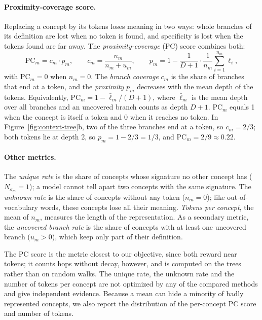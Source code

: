 \paragraph{Proximity-coverage score.}
Replacing a concept by its tokens loses meaning in two ways: whole branches of its definition are lost when no token is found, and specificity is lost when the tokens found are far away.
The \emph{proximity-coverage} (PC) score combines both:
\[
\mathrm{PC}_m = c_m \cdot p_m,
\qquad
c_m = \frac{n_m}{n_m + u_m},
\qquad
p_m = 1 - \frac{1}{D + 1} \cdot \frac{1}{n_m} \sum_{i=1}^{n_m} \ell_i ,
\]
with $\mathrm{PC}_m = 0$ when $n_m = 0$.
The \emph{branch coverage} $c_m$ is the share of branches that end at a token, and the \emph{proximity} $p_m$ decreases with the mean depth of the tokens.
Equivalently, $\mathrm{PC}_m = 1 - \bar\ell_m / (D + 1)$, where $\bar\ell_m$ is the mean depth over all branches and an uncovered branch counts as depth $D + 1$.
$\mathrm{PC}_m$ equals 1 when the concept is itself a token and 0 when it reaches no token.
In Figure~\ref{fig:context-tree}b, two of the three branches end at a token, so $c_m = 2/3$; both tokens lie at depth 2, so $p_m = 1 - 2/3 = 1/3$, and $\mathrm{PC}_m = 2/9 \approx 0.22$.

\paragraph{Other metrics.}
The \emph{unique rate} is the share of concepts whose signature no other concept has ($N_{\sigma_m} = 1$); a model cannot tell apart two concepts with the same signature.
The \emph{unknown rate} is the share of concepts without any token ($n_m = 0$); like out-of-vocabulary words, these concepts lose all their meaning.
\emph{Tokens per concept}, the mean of $n_m$, measures the length of the representation.
As a secondary metric, the \emph{uncovered branch rate} is the share of concepts with at least one uncovered branch ($u_m > 0$), which keep only part of their definition.

The PC score is the metric closest to our objective, since both reward near tokens; it counts hops without decay, however, and is computed on the trees rather than on random walks.
The unique rate, the unknown rate and the number of tokens per concept are not optimized by any of the compared methods and give independent evidence.
Because a mean can hide a minority of badly represented concepts, we also report the distribution of the per-concept PC score and number of tokens.

